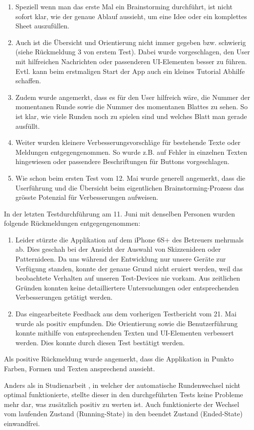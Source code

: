 \begin{enumerate}
	\item Speziell wenn man das erste Mal ein Brainstorming durchführt, ist nicht sofort klar, wie der genaue Ablauf aussieht, um eine Idee oder ein komplettes Sheet auszufüllen. 
	\item Auch ist die Übersicht und Orientierung nicht immer gegeben bzw. schwierig (siehe Rückmeldung 3 von erstem Test). Dabei wurde vorgeschlagen, den User mit hilfreichen Nachrichten oder passenderen UI-Elementen besser zu führen. Evtl. kann beim erstmaligen Start der App auch ein kleines Tutorial Abhilfe schaffen.
	\item Zudem wurde angemerkt, dass es für den User hilfreich wäre, die Nummer der momentanen Runde sowie die Nummer des momentanen Blattes zu sehen. So ist klar, wie viele Runden noch zu spielen sind und welches Blatt man gerade ausfüllt.
	\item Weiter wurden kleinere Verbesserungsvorschläge für bestehende Texte oder Meldungen entgegengenommen. So wurde z.B. auf Fehler in einzelnen Texten hingewiesen oder passendere Beschriftungen für Buttons vorgeschlagen.
	\item  Wie schon beim ersten Test vom 12. Mai wurde generell angemerkt, dass die Userführung und die Übersicht beim eigentlichen Brainstorming-Prozess das grösste Potenzial für Verbesserungen aufweisen.
\end{enumerate}

In der letzten Testdurchführung am 11. Juni mit denselben Personen wurden folgende Rückmeldungen entgegengenommen:
\begin{enumerate}
	\item Leider stürzte die Applikation auf dem iPhone 6S+ des Betreuers mehrmals ab. Dies geschah bei der Ansicht der Auswahl von Skizzenideen oder Patternideen. Da uns während der Entwicklung nur unsere Geräte zur Verfügung standen, konnte der genaue Grund nicht eruiert werden, weil das beobachtete Verhalten auf unseren Test-Devices nie vorkam. Aus zeitlichen Gründen konnten keine detailliertere Untersuchungen oder entsprechenden Verbesserungen getätigt werden. 
	\item Das eingearbeitete Feedback aus dem vorherigen Testbericht vom 21. Mai wurde als positiv empfunden. Die Orientierung sowie die Benutzerführung konnte mithilfe von entsprechenden Texten und UI-Elementen verbessert werden. Dies konnte durch diesen Test bestätigt werden. 
\end{enumerate}

Als positive Rückmeldung wurde angemerkt, dass die Applikation in Punkto Farben, Formen und Texten ansprechend aussieht.

Anders als in Studienarbeit \cite{methode635-sa}, in welcher der automatische Rundenwechsel nicht optimal funktionierte, stellte dieser in den durchgeführten Tests keine Probleme mehr dar, was zusätzlich positiv zu werten ist. Auch funktionierte der Wechsel vom laufenden Zustand (Running-State) in den beendet Zustand (Ended-State) einwandfrei. 


